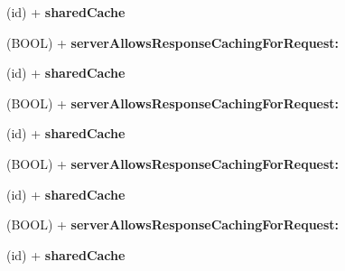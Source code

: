 \begin{DoxyCompactItemize}
\item 
\hypertarget{interface_a_s_i_download_cache_aa3f734926635c674880b0b626d3b10e6}{
(id) + {\bfseries shared\-Cache}}
\label{interface_a_s_i_download_cache_aa3f734926635c674880b0b626d3b10e6}

\item 
\hypertarget{interface_a_s_i_download_cache_a29ab27733d818070c22611c9cd38a338}{
(\-B\-O\-O\-L) + {\bfseries server\-Allows\-Response\-Caching\-For\-Request\-:}}
\label{interface_a_s_i_download_cache_a29ab27733d818070c22611c9cd38a338}

\item 
\hypertarget{interface_a_s_i_download_cache_aa3f734926635c674880b0b626d3b10e6}{
(id) + {\bfseries shared\-Cache}}
\label{interface_a_s_i_download_cache_aa3f734926635c674880b0b626d3b10e6}

\item 
\hypertarget{interface_a_s_i_download_cache_a29ab27733d818070c22611c9cd38a338}{
(\-B\-O\-O\-L) + {\bfseries server\-Allows\-Response\-Caching\-For\-Request\-:}}
\label{interface_a_s_i_download_cache_a29ab27733d818070c22611c9cd38a338}

\item 
\hypertarget{interface_a_s_i_download_cache_aa3f734926635c674880b0b626d3b10e6}{
(id) + {\bfseries shared\-Cache}}
\label{interface_a_s_i_download_cache_aa3f734926635c674880b0b626d3b10e6}

\item 
\hypertarget{interface_a_s_i_download_cache_a29ab27733d818070c22611c9cd38a338}{
(\-B\-O\-O\-L) + {\bfseries server\-Allows\-Response\-Caching\-For\-Request\-:}}
\label{interface_a_s_i_download_cache_a29ab27733d818070c22611c9cd38a338}

\item 
\hypertarget{interface_a_s_i_download_cache_aa3f734926635c674880b0b626d3b10e6}{
(id) + {\bfseries shared\-Cache}}
\label{interface_a_s_i_download_cache_aa3f734926635c674880b0b626d3b10e6}

\item 
\hypertarget{interface_a_s_i_download_cache_a29ab27733d818070c22611c9cd38a338}{
(\-B\-O\-O\-L) + {\bfseries server\-Allows\-Response\-Caching\-For\-Request\-:}}
\label{interface_a_s_i_download_cache_a29ab27733d818070c22611c9cd38a338}

\item 
\hypertarget{interface_a_s_i_download_cache_aa3f734926635c674880b0b626d3b10e6}{
(id) + {\bfseries shared\-Cache}}
\label{interface_a_s_i_download_cache_aa3f734926635c674880b0b626d3b10e6}


\end{DoxyCompactItemize}
